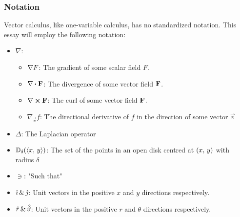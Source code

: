 \subsubsection{Notation}
Vector calculus, like one-variable calculus, has no standardized notation. This essay will employ the following
notation:
\begin{itemize}
	\item $\nabla$:
	\begin{itemize}
		\item $\nabla F$: The gradient of some scalar field $F$.
		\item $\divergence{\fatf}$: The divergence of some vector field $\mathbf{F}$.
		\item $\curl{\fatf}$: The curl of some vector field $\mathbf{F}$.
		\item $\nabla_\vec{v}f$: The directional derivative of $f$ in the direction of some vector $\vec{v}$
	\end{itemize}
	\item $\Delta$: The Laplacian operator
	\item $\mathbb{D}_\delta(\langle x,\,y\rangle)$: The set of the points in an open disk centred at $\left(x,\,y\right)$ with radius $\delta$
	\item $\ni$: "Such that"
	\item $\hat{\imath}\,\&\,\hat{\jmath}$: Unit vectors in the positive $x$ and $y$ directions respectively.
	\item $\hat{r}\,\&\,\hat{\vartheta}$: Unit vectors in the positive $r$ and $\theta$ directions respectively.
\end{itemize}

